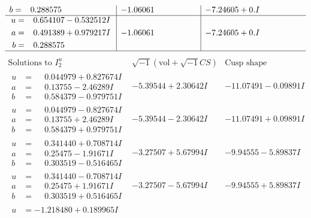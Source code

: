 \documentclass[1p]{elsarticle_modified}
\theoremstyle{definition}
\newcommand{\I}{\sqrt{-1}}
\begin{document}
$$\begin{array}{c|c|c}
\begin{aligned}
b &= \phantom{-}0.288575\phantom{ +0.000000I}\end{aligned}
 & -1.06061\phantom{ +0.000000I} & -7.24605 + 0. I\phantom{ +0.000000I} \\ \hline\begin{aligned}
u &= \phantom{-}0.654107 - 0.532512 I \\
a &= \phantom{-}0.491389 + 0.979217 I \\
b &= \phantom{-}0.288575\phantom{ +0.000000I}\end{aligned}
 & -1.06061\phantom{ +0.000000I} & -7.24605 + 0. I\phantom{ +0.000000I}\\
 \hline 
 \end{array}$$\newpage$$\begin{array}{c|c|c}  
\text{Solutions to }I^u_{2}& \I (\text{vol} + \sqrt{-1}CS) & \text{Cusp shape}\\
 \hline 
\begin{aligned}
u &= \phantom{-}0.044979 + 0.827674 I \\
a &= \phantom{-}0.13755 - 2.46289 I \\
b &= \phantom{-}0.584379 - 0.979751 I\end{aligned}
 & -5.39544 + 2.30642 I & -11.07491 - 0.09891 I \\ \hline\begin{aligned}
u &= \phantom{-}0.044979 - 0.827674 I \\
a &= \phantom{-}0.13755 + 2.46289 I \\
b &= \phantom{-}0.584379 + 0.979751 I\end{aligned}
 & -5.39544 - 2.30642 I & -11.07491 + 0.09891 I \\ \hline\begin{aligned}
u &= \phantom{-}0.341440 + 0.708714 I \\
a &= \phantom{-}0.25475 - 1.91671 I \\
b &= \phantom{-}0.303519 - 0.516465 I\end{aligned}
 & -3.27507 + 5.67994 I & -9.94555 - 5.89837 I \\ \hline\begin{aligned}
u &= \phantom{-}0.341440 - 0.708714 I \\
a &= \phantom{-}0.25475 + 1.91671 I \\
b &= \phantom{-}0.303519 + 0.516465 I\end{aligned}
 & -3.27507 - 5.67994 I & -9.94555 + 5.89837 I \\ \hline\begin{aligned}
u &= -1.218480 + 0.189965 I \\

\end{aligned}
\end{array}$$
\end{document}
